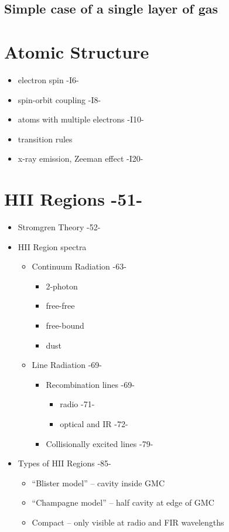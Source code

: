 \documentclass[12pt]{article}
\begin{document}
\subsection{Simple case of a single layer of gas}

\section{Atomic Structure}
\begin{itemize}
  \item electron spin -I6-
  \item spin-orbit coupling -I8-
  \item atoms with multiple electrons -I10-
  \item transition rules
  \item x-ray emission, Zeeman effect -I20-
\end{itemize}

\section{HII Regions -51-}
\begin{itemize}
    \item Stromgren Theory -52-
    \item HII Region spectra
    \begin{itemize}
        \item Continuum Radiation -63-
        \begin{itemize}
            \item 2-photon
            \item free-free
            \item free-bound
            \item dust
        \end{itemize}
        \item Line Radiation -69-
        \begin{itemize}
            \item Recombination lines -69-
            \begin{itemize}
                \item radio -71-
                \item optical and IR -72-
            \end{itemize}
            \item Collisionally excited lines -79-
        \end{itemize}
    \end{itemize}
\item Types of HII Regions -85-
    \begin{itemize}
        \item ``Blister model'' -- cavity inside GMC
        \item ``Champagne model'' -- half cavity at edge of GMC
        \item Compact -- only visible at radio and FIR wavelengths
    \end{itemize}
\end{itemize}
\end{document}
